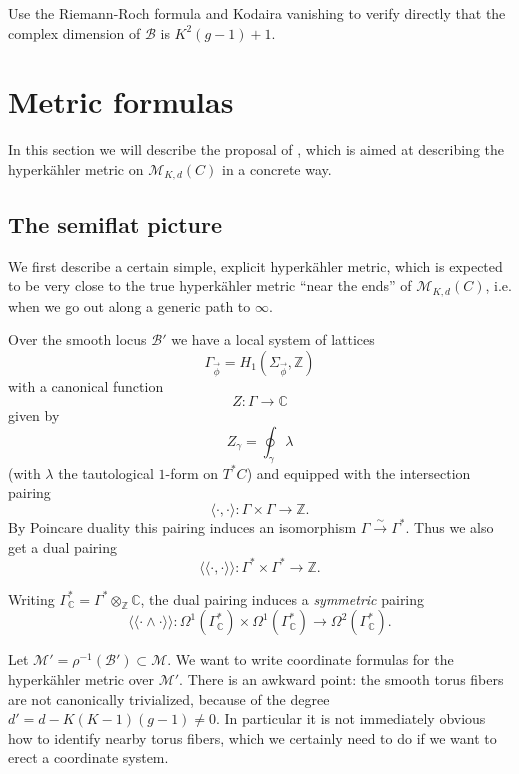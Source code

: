 \documentclass[12pt,letterpaper,reqno]{article}
\numberwithin{equation}{section}
\newcommand{\cB}{\ensuremath{\mathcal B}}
\newcommand{\cM}{\ensuremath{\mathcal M}}
\newcommand{\C}{\ensuremath{\mathbb C}}
\newcommand{\Z}{\ensuremath{\mathbb Z}}
\newcommand{\hk}{hyperk\"ahler\xspace}
\newcommand{\IP}[1]{\langle#1\rangle}
\newcommand{\DIP}[1]{\langle\!\langle#1\rangle\!\rangle}
\newcommand{\simarrow}{\xrightarrow\sim}
\newcommand{\ti}[1]{\textit{#1}}
\begin{document}
\begin{exercise} Use the Riemann-Roch formula and Kodaira vanishing 
to verify directly that the complex dimension of $\cB$ is $K^2(g-1)+1$.
\end{exercise}


\section{Metric formulas}

In this section we will 
describe the proposal of \cite{Gaiotto:2008cd,Gaiotto:2009hg,Gaiotto2012}, which is aimed at describing the
\hk metric on $\cM_{K,d}(C)$ in a concrete way.


\subsection{The semiflat picture}

We first describe a certain simple, explicit \hk metric, which is expected
to be very close to the true \hk metric ``near the ends'' of
$\cM_{K,d}(C)$, i.e. when we go out along a generic path to $\infty$.

Over the smooth locus $\cB'$ we have a local system of lattices
$$\Gamma_{\vec \phi} = H_1(\Sigma_{\vec \phi},\Z)$$
with a canonical function
$$ Z: \Gamma \to \C $$
given by
$$ Z_\gamma = \oint_\gamma \lambda $$
(with $\lambda$ the tautological $1$-form on $T^* C$)
and equipped with the intersection pairing
$$ \IP{\cdot,\cdot}: \Gamma \times \Gamma \to \Z. $$
By Poincare duality this pairing induces an isomorphism
$\Gamma \simarrow \Gamma^*$. Thus we also get a dual pairing
$$ \DIP{\cdot,\cdot}: \Gamma^* \times \Gamma^* \to \Z. $$

Writing $\Gamma^*_\C = \Gamma^* \otimes_\Z \C$,
the dual pairing induces a \ti{symmetric} pairing 
$$ \DIP{\cdot \wedge \cdot}: \Omega^1(\Gamma^*_\C) \times \Omega^1(\Gamma^*_\C) \to \Omega^2(\Gamma^*_\C). $$

Let $\cM' = \rho^{-1}(\cB') \subset \cM$.
We want to write coordinate formulas for the \hk metric over $\cM'$.
There is an awkward point: the smooth torus fibers are 
not canonically trivialized, because of the 
degree $d' = d - K(K-1)(g-1) \neq 0$. In particular it is not immediately obvious
how to identify nearby torus fibers, which we certainly need to do if 
we want to erect a coordinate system.
\end{document}
